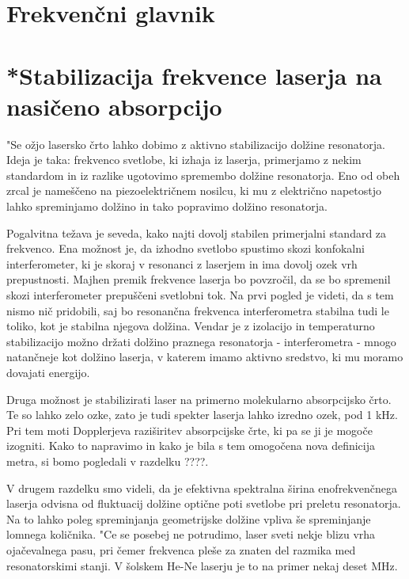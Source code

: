 \section{Frekvenčni glavnik}

\section{*Stabilizacija frekvence laserja na na\-sičeno absorpcijo}
\label{chap:stabilizacija}

"Se ožjo lasersko črto lahko dobimo z aktivno stabilizacijo dolžine
resonatorja. Ideja je taka: frekvenco svetlobe, ki izhaja iz laserja,
primerjamo z nekim standardom in iz razlike ugotovimo spremembo dolžine
resonatorja. Eno od obeh zrcal je nameščeno na piezoelektričnem nosilcu,
ki mu z električno napetostjo lahko spreminjamo dolžino in tako popravimo
dolžino resonatorja.

Pogalvitna težava je seveda, kako najti dovolj stabilen primerjalni
standard za frekvenco. Ena možnost je, da izhodno svetlobo spustimo skozi
konfokalni interferometer, ki je skoraj v resonanci z laserjem in ima dovolj
ozek vrh prepustnosti. Majhen premik frekvence laserja bo povzročil, da se
bo spremenil skozi interferometer prepuščeni svetlobni tok. Na prvi pogled
je videti, da s tem nismo nič pridobili, saj bo resonančna frekvenca
interferometra stabilna tudi le toliko, kot je stabilna njegova dolžina.
Vendar je z izolacijo in temperaturno stabilizacijo možno držati dolžino
praznega resonatorja - interferometra - mnogo natančneje kot dolžino
laserja, v katerem imamo aktivno sredstvo, ki mu moramo dovajati energijo.

Druga možnost je stabilizirati laser na primerno molekularno absorpcijsko
črto. Te so lahko zelo ozke, zato je tudi spekter laserja lahko izredno
ozek, pod 1 kHz. Pri tem moti Dopplerjeva raziširitev absorpcijske črte,
ki pa se ji je mogoče izogniti. Kako to napravimo in kako je bila s tem
omogočena nova definicija metra, si bomo pogledali v razdelku ????.


V drugem razdelku smo videli, da je efektivna spektralna širina
eno\-frekvenčnega laserja odvisna od fluktuacij dolžine optične poti
svetlobe pri preletu resonatorja. Na to lahko poleg spreminjanja
geometrijske dolžine vpliva še spreminjanje lomnega količnika. "Ce se
posebej ne potrudimo, laser sveti nekje blizu vrha ojačevalnega pasu, pri
čemer frekvenca pleše za znaten del razmika med resonatorskimi stanji. V
šolskem He-Ne laserju je to na primer nekaj deset MHz.

